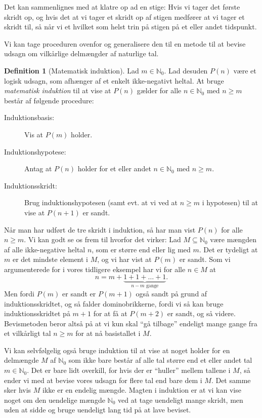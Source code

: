 \documentclass[a4paper, 12pt]{article}
\numberwithin{equation}{section}
\theoremstyle{plain}
\theoremstyle{definition}
\newtheorem{definition}[saetning]{Definition}
\newcommand{\N}{\mathbb{N}}
\begin{document}
      Det kan sammenlignes med at klatre op ad en stige: Hvis vi tager det første skridt op, og hvis det at vi tager et skridt op af stigen medfører at vi tager et skridt til, så når vi et hvilket som helst trin på stigen på et eller andet tidspunkt.

      Vi kan tage proceduren ovenfor og generalisere den til en metode til at bevise udsagn om vilkårlige delmængder af naturlige tal.
\begin{definition}[Matematisk induktion]
  Lad \(m\in\N_0\). Lad desuden \(P(n)\) være et logisk udsagn, som afhænger af et enkelt ikke-negativt heltal. At bruge \emph{matematisk induktion} til at vise at \(P(n)\) gælder for alle \(n\in\N_0\) med \(n\ge m\) består af følgende procedure:
  \begin{description}
  \item[Induktionsbasis:] Vis at \(P(m)\) holder.
  \item[Induktionshypotese:] Antag at \(P(n)\) holder for et eller andet \(n\in \N_0\) med \(n\ge m\).
    \item[Induktionsskridt:] Brug induktionshypotesen (samt evt. at vi ved at \(n\ge m\) i hypotesen) til at vise at \(P(n+1)\) er sandt.
  \end{description}
\end{definition}
Når man har udført de tre skridt i induktion, så har man vist \(P(n)\) for alle \(n\ge m\). Vi kan godt se os frem til hvorfor det virker: Lad \(M\subseteq \N_0\) være mængden af alle ikke-negative heltal \(n\), som er større end eller lig med \(m\). Det er tydeligt at \(m\) er det mindste element i \(M\), og vi har vist at \(P(m)\) er sandt. Som vi argumenterede for i vores tidligere eksempel har vi for alle \(n\in M\) at
\[
  n=m+\underbrace{1+1+\ldots+1}_{n-m\text{ gange}}.
\]
Men fordi \(P(m)\) er sandt er \(P(m+1)\) også sandt på grund af induktionsskridtet, og så falder dominobrikkerne, fordi vi så kan bruge induktionsskridtet på \(m+1\) for at få at \(P(m+2)\) er sandt, og så videre. Bevismetoden beror altså på at vi kun skal ``gå tilbage'' endeligt mange gange fra et vilkårligt tal \(n\ge m\) for at nå basistallet i \(M\).

Vi kan selvfølgelig også bruge induktion til at vise at noget holder for en delmængde \(M\) af \(\N_0\) som ikke bare består af alle tal større end et eller andet tal \(m\in\N_0\). Det er bare lidt overkill, for hvis der er ``huller'' mellem tallene i \(M\), så ender vi med at bevise vores udsagn for flere tal end bare dem i \(M\). Det samme sker hvis \(M\) ikke er en endelig mængde. Magten i induktion er at vi kan vise noget om den uendelige mængde \(\N_0\) ved at tage uendeligt mange skridt, men uden at sidde og bruge uendeligt lang tid på at lave beviset.
\end{document}
